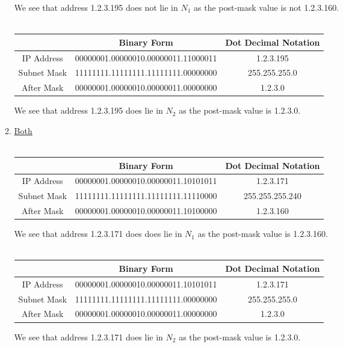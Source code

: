 \documentclass[12pt]{article}
\begin{document}
\begin{enumerate}
\begin{enumerate}
        We see that address 1.2.3.195 does not lie in $N_1$ as the post-mask value is not 1.2.3.160.\\ \\
        \begin{tabular}{ |c|c|c| } 
         \hline
         & Binary Form & Dot Decimal Notation \\ 
         \hline
         IP Address & 00000001.00000010.00000011.11000011 & 1.2.3.195 \\ 
         Subnet Mask & 11111111.11111111.11111111.00000000 & 255.255.255.0 \\
         After Mask & 00000001.00000010.00000011.00000000 & 1.2.3.0 \\
         \hline
        \end{tabular}
        
        We see that address 1.2.3.195 does lie in $N_2$ as the post-mask value is 1.2.3.0. \\
        
        \item \underline{Both}\\ \\
        \begin{tabular}{ |c|c|c| } 
         \hline
         & Binary Form & Dot Decimal Notation \\ 
         \hline
         IP Address & 00000001.00000010.00000011.10101011 & 1.2.3.171 \\ 
         Subnet Mask & 11111111.11111111.11111111.11110000 & 255.255.255.240 \\
         After Mask & 00000001.00000010.00000011.10100000 & 1.2.3.160 \\
         \hline
        \end{tabular}
        
        We see that address 1.2.3.171 does does lie in $N_1$ as the post-mask value is 1.2.3.160. \\ \\
        \begin{tabular}{ |c|c|c| } 
         \hline
         & Binary Form & Dot Decimal Notation \\ 
         \hline
         IP Address & 00000001.00000010.00000011.10101011 & 1.2.3.171 \\ 
         Subnet Mask & 11111111.11111111.11111111.00000000 & 255.255.255.0 \\
         After Mask & 00000001.00000010.00000011.00000000 & 1.2.3.0 \\
         \hline
        \end{tabular}
        
        We see that address 1.2.3.171 does lie in $N_2$ as the post-mask value is 1.2.3.0.
    \end{enumerate}
\end{enumerate}
\end{document}
